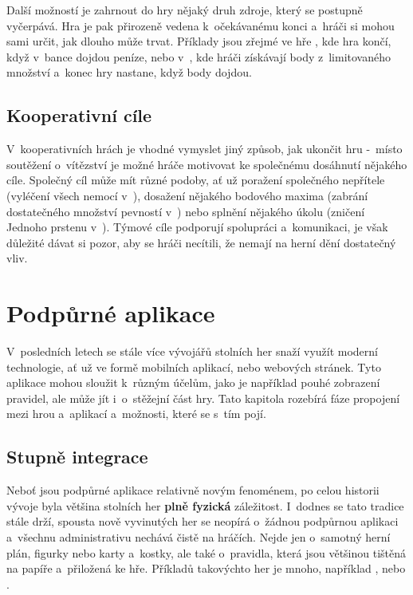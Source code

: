 Další možností je zahrnout do hry nějaký druh zdroje, který se postupně vyčerpává. Hra je pak přirozeně vedena k~očekávanému konci a~hráči si mohou sami určit, jak dlouho může trvat. Příklady jsou zřejmé ve hře , kde hra končí, když v~bance dojdou peníze, nebo v~, kde hráči získávají body z~limitovaného množství a~konec hry nastane, když body dojdou.

\subsection{Kooperativní cíle}
\label{subsec:end_cooperative_goals}

V~kooperativních hrách je vhodné vymyslet jiný způsob, jak ukončit hru -~místo soutěžení o~vítězství je možné hráče motivovat ke společnému dosáhnutí nějakého cíle. Společný cíl může mít různé podoby, ať už poražení společného nepřítele (vyléčení všech nemocí v~), dosažení nějakého bodového maxima (zabrání dostatečného množství pevností v~) nebo splnění nějakého úkolu (zničení Jednoho prstenu v~). Týmové cíle podporují spolupráci a~komunikaci, je však důležité dávat si pozor, aby se hráči necítili, že nemají na herní dění dostatečný vliv.


\section{Podpůrné aplikace}
\label{sec:apps}

V~posledních letech se stále více vývojářů stolních her snaží využít moderní technologie, ať už ve formě mobilních aplikací, nebo webových stránek. Tyto aplikace mohou sloužit k~různým účelům, jako je například pouhé zobrazení pravidel, ale může jít i~o~stěžejní část hry. Tato kapitola rozebírá fáze propojení mezi hrou a~aplikací a~možnosti, které se s~tím pojí. \cite{corvus_belli_2023}

\subsection{Stupně integrace}
\label{subsec:apps_app_integration}

Neboť jsou podpůrné aplikace relativně novým fenoménem, po celou historii vývoje byla většina stolních her \textbf{plně fyzická} záležitost. I~dodnes se tato tradice stále drží, spousta nově vyvinutých her se neopírá o~žádnou podpůrnou aplikaci a~všechnu administrativu nechává čistě na hráčích. Nejde jen o~samotný herní plán, figurky nebo karty a~kostky, ale také o~pravidla, která jsou většinou tištěná na papíře a~přiložená ke hře. Příkladů takovýchto her je mnoho, například ,  nebo .

